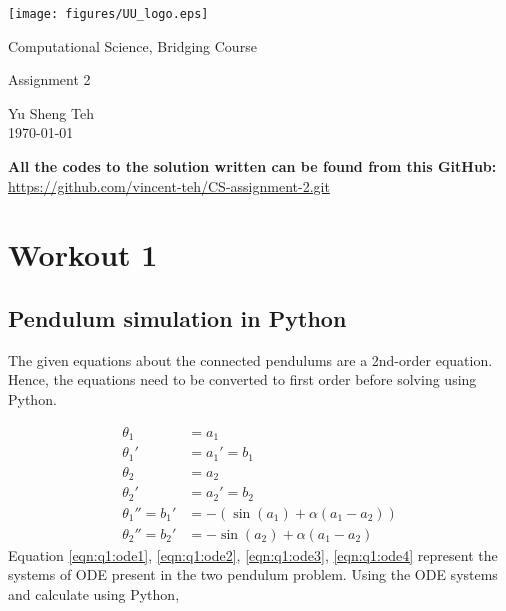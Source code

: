 \documentclass{article}
\begin{document}
\begin{titlepage}
  \begin{center}
    \texttt{[image: figures/UU\_logo.eps]}
  \end{center}
  \vspace{3em}
  \begin{center}
    \Large Computational Science, Bridging Course
  \end{center}
  \vspace{5em}
  \begin{center}
    \Large Assignment 2
  \end{center}
  \vspace{10em}
  \begin{center}
    Yu Sheng Teh\\[0.5em]
    \today
  \end{center}
\end{titlepage}

\tableofcontents
\newpage

\textbf{All the codes to the solution written can be found from this GitHub:} \\
\url{https://github.com/vincent-teh/CS-assignment-2.git}

\section{Workout 1}%
\label{sec:Workout 1}
\subsection{Pendulum simulation in Python}%
\label{sub:Pendulum simulation in Python}
The given equations about the connected pendulums are a 2nd-order equation. Hence, the equations need to be converted to first order before solving using Python. 

\begin{align}
  \theta_1 &= a_1    \\
  \theta_1' &= a_1' = b_1 \\
  \theta_2 &= a_2  \label{eqn:q1:ode1} \\
  \theta_2' &= a_2' = b_2 \label{eqn:q1:ode2} \\
  \theta_1'' = b_1' &= -(\sin(a_1) + \alpha(a_1 - a_2)) \label{eqn:q1:ode3} \\
  \theta_2'' = b_2' &= -\sin(a_2) + \alpha(a_1 - a_2) \label{eqn:q1:ode4}
\end{align}
Equation \ref{eqn:q1:ode1}, \ref{eqn:q1:ode2}, \ref{eqn:q1:ode3}, \ref{eqn:q1:ode4} represent the systems of ODE present in the two pendulum problem. Using the ODE systems and calculate using Python,
\end{document}
